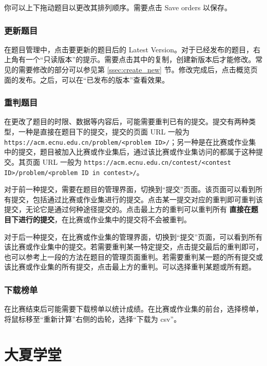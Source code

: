 \documentclass[oneside]{book}
\begin{document}
你可以上下拖动题目以更改其排列顺序。需要点击 Save orders 以保存。

\subsection{更新题目}

\label{ssec:update_problem}

在题目管理中，点击要更新的题目后的 Latest Version。对于已经发布的题目，右上角有一个``只读版本''的提示。需要点击其中的复制，创建新版本后才能修改。常见的需要修改的部分可以参见第 \ref{ssec:create_new} 节。修改完成后，点击概览页面的发布。之后，可以在``已发布的版本''查看效果。

\subsection{重判题目}

\label{ssec:rejudge_problem}

在更改了题目的时限、数据等内容后，可能需要重判已有的提交。提交有两种类型，一种是直接在题目下的提交，提交的页面 URL 一般为 \lstinline|https://acm.ecnu.edu.cn/problem/<problem ID>/|；另一种是在比赛或作业集中的提交，题目被加入比赛或作业集后，通过该比赛或作业集访问的都属于这种提交。其页面 URL 一般为 \lstinline|https://acm.ecnu.edu.cn/contest/<contest ID>/problem/<problem ID in contest>/|。

对于前一种提交，需要在题目的管理界面，切换到``提交''页面。该页面可以看到所有提交，包括通过比赛或作业集进行的提交。点击某一提交对应的重判即可重判该提交，无论它是通过何种途径提交的。点击最上方的重判可以重判所有\textbf{\color{red} 直接在题目下进行的提交}，在比赛或作业集中的提交将不会被重判。

对于后一种提交，在比赛或作业集的管理界面，切换到``提交''页面，可以看到所有该比赛或作业集中的提交。若需要重判某一特定提交，点击提交最后的重判即可，也可以参考上一段的方法在题目的管理页面重判。若需要重判某一题的所有提交或该比赛或作业集的所有提交，点击最上方的重判。可以选择重判某题或所有题。

\subsection{下载榜单}

\label{ssec:download_ranking_list}

在比赛结束后可能需要下载榜单以统计成绩。在比赛或作业集的前台，选择榜单，将鼠标移至``重新计算''右侧的齿轮，选择``下载为 csv''。

\chapter{大夏学堂}
\end{document}
